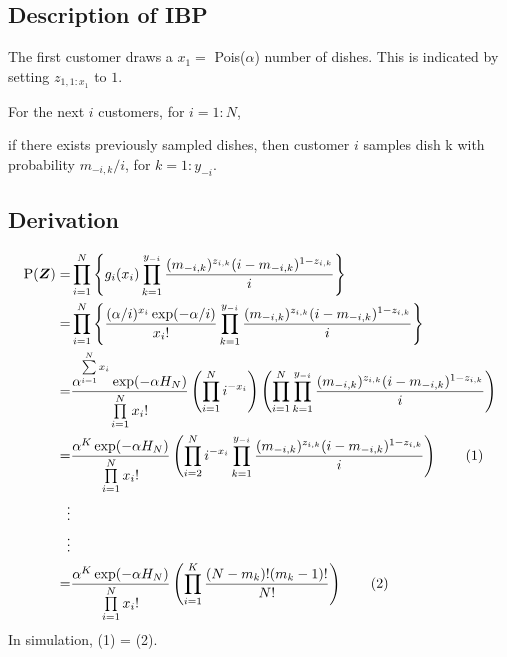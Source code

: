 \documentclass{article}
\def\prodl#1#2#3{\prod\limits_{#1=#2}^{#3}}
\def\suml#1#2#3{\sum\limits_{#1=#2}^{#3}}
\def\ds{\displaystyle}
\newcommand\numberthis{\addtocounter{equation}{1}\tag{\theequation}}
\renewenvironment{itemize}[1]{\begin{compactitem}#1}{\end{compactitem}}
\begin{document}
\subsection{Description of IBP}
\begin{itemize}
  \item The first customer draws a $x_1=$ Pois($\alpha$) number of dishes. This
        is indicated by setting $z_{1,1:x_1}$ to $1$.
  \item For the next $i$ customers, for $i=1:N$, 
     \begin{itemize}
       \item if there exists previously sampled dishes, then customer $i$
             samples dish k  with probability $m_{-i,k}/i$, for $ k = 1:y_{-i}$.
     \end{itemize}
\end{itemize}


\subsection{Derivation}
\begin{align*}
  \text{P}(\bm Z)
  =&\prodl{i}{1}{N} \left\{g_i(x_i) \prodl{k}{1}{y_{-i}} 
    \frac{(m_{-i,k})^{z_{i,k}}(i-m_{-i,k})^{1-z_{i,k}}}{i}\right\}\\
  =&\prodl{i}{1}{N} \left\{ \ds\frac{(\alpha/i)^{x_i}\exp(-\alpha/i)}{x_i!} 
    \prodl{k}{1}{y_{-i}} 
    \ds\frac{(m_{-i,k})^{z_{i,k}}(i-m_{-i,k})^{1-z_{i,k}}}{i} \right\} \\
  =&\ds\frac{\alpha^{\suml{i}{1}{N}x_i} \exp(-\alpha H_N)} {\prodl{i}{1}{N}x_i!} 
    \left( \prodl{i}{1}{N}i^{-x_i} \right)
    \left( \prodl{i}{1}{N}\prodl{k}{1}{y_{-i}} 
    \ds\frac{(m_{-i,k})^{z_{i,k}}(i-m_{-i,k})^{1-z_{i,k}}}{i} \right)\\
  =&\ds\frac{\alpha^K \exp(-\alpha H_N)} {\prodl{i}{1}{N}x_i!} 
    \left( \prodl{i}{2}{N} i^{-x_i}\prodl{k}{1}{y_{-i}} 
    \ds\frac{(m_{-i,k})^{z_{i,k}}(i-m_{-i,k})^{1-z_{i,k}}}{i} \right)
    \numberthis\\
  \vdots&\\
  \vdots&\\
  =&\ds\frac{\alpha^K \exp(-\alpha H_N)} {\prodl{i}{1}{N}x_i!} 
    \left( \prodl{i}{1}{K} \ds\frac{(N-m_k)!(m_k-1)!}{N!} \right) \numberthis
\end{align*}
In simulation, (1) = (2).

\newpage
\end{document}
